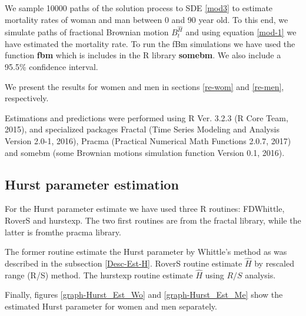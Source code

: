 \documentclass[smallextended]{svjour3}
\begin{document}
        We sample \num{10000} paths of the solution process to SDE 
    \eqref{mod3} to estimate mortality rates of woman and man between \num{0} 
    and \num{90} year old. To this end, we simulate paths of fractional 
    Brownian motion $B_t^{\hat H}$  and using equation \eqref{mod-1} we have 
    estimated the mortality rate. To run the fBm simulations we have used the 
    function {\bf fbm} which is includes in the R library {\bf somebm}.
    We also include a  95.5\% confidence interval.

        We present the results for women and men in sections \ref{re-wom} and
    \ref{re-men}, respectively.

        Estimations and predictions were performed using R Ver. 3.2.3 (R Core 
    Team, 2015), and specialized packages Fractal (Time Series Modeling and 
    Analysis Version 2.0-1, 2016), 
    Pracma (Practical Numerical Math Functions 2.0.7, 2017)
    and somebm (some Brownian motions simulation function Version 0.1, 2016).

    \subsection{Hurst parameter estimation}
        \label{hu-est}

        For the Hurst parameter estimate we have used three R routines: 
    FDWhittle, RoverS and hurstexp. The two first routines are from the 
    fractal library, while the latter is fromthe pracma library.

        The former routine estimate the Hurst parameter by Whittle's method as 
    was described in the subsection \ref{Desc-Est-H}. RoverS routine
    estimate $\hat H $ by rescaled range (R/S) method. The hurstexp routine
    estimate $\hat H $  using $R/S$ analysis. 

        Finally, figures \ref{graph-Hurst_Est_Wo} and \ref{graph-Hurst_Est_Me} 
    show the estimated Hurst parameter for women and men separately.
\end{document}
